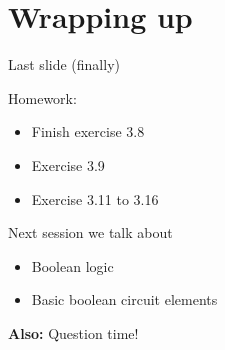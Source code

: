 \documentclass[11pt]{tudbeamer}
\begin{document}
\section{Wrapping up}

\begin{frame}{Last slide (finally)}

	Homework:
	\begin{itemize}
		\item Finish exercise 3.8
		\item Exercise 3.9
		\item Exercise 3.11 to 3.16
	\end{itemize}
	\vspace{1em}
	
	Next session we talk about
	\begin{itemize}
		\item Boolean logic
		\item Basic boolean circuit elements
	\end{itemize} 
	\vspace{1em}
	\textbf{Also:} Question time!

\end{frame}
\end{document}
